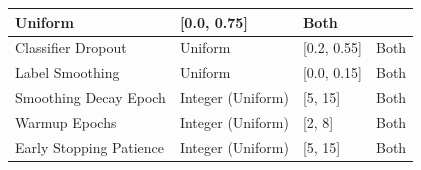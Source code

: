 \documentclass[preprint,12pt]{elsarticle}
\begin{document}
\begin{table}[!t]
\begin{tabular}{|p{}|p{}|p{}|p{}|}
        Uniform                                                                  &
        [0.0, 0.75]                                                              &
        Both                                                                                                                                                           \\
        \hline
        Classifier Dropout                                                       &
        Uniform                                                                  &
        [0.2, 0.55]                                                              &
        Both                                                                                                                                                           \\
        \hline
        Label Smoothing                                                          &
        Uniform                                                                  &
        [0.0, 0.15]                                                              &
        Both                                                                                                                                                           \\
        \hline
        Smoothing Decay Epoch                                                    &
        Integer (Uniform)                                                        &
        [5, 15]                                                                  &
        Both                                                                                                                                                           \\
        \hline
        Warmup Epochs                                                            &
        Integer (Uniform)                                                        &
        [2, 8]                                                                   &
        Both                                                                                                                                                           \\
        \hline
        Early Stopping Patience                                                  &
        Integer (Uniform)                                                        &
        [5, 15]                                                                  &
        Both                                                                                                                                                           \\

\end{tabular}
\end{table}
\end{document}
